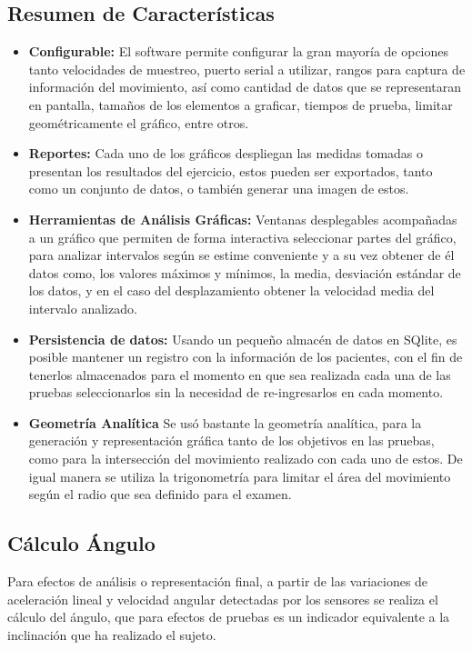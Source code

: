 \documentclass[12pt,a4paper]{article}
\begin{document}
\subsection{Resumen de Características}
\begin{itemize}
	\item \textbf{Configurable:} El software permite configurar la gran mayoría de opciones tanto velocidades de muestreo, puerto serial a utilizar, rangos para captura de información del movimiento, así como cantidad de datos que se representaran en pantalla, tamaños de los elementos a graficar, tiempos de prueba, limitar geométricamente el gráfico, entre otros.
	\item \textbf{Reportes:} Cada uno de los gráficos despliegan las medidas tomadas o presentan los resultados del ejercicio, estos pueden ser exportados, tanto como un conjunto de datos, o también generar una imagen de estos.
	\item \textbf{Herramientas de Análisis Gráficas:} Ventanas desplegables acompañadas a un gráfico que permiten de forma interactiva seleccionar partes del gráfico, para analizar intervalos según se estime conveniente y a su vez obtener de él datos como, los valores máximos y mínimos, la media, desviación estándar de los datos, y en el caso del desplazamiento obtener la velocidad media del intervalo analizado.
	\item \textbf{Persistencia de datos:} Usando un pequeño almacén de datos en SQlite, es posible mantener un registro con la información de los pacientes, con el fin de tenerlos almacenados para el momento en que sea realizada cada una de las pruebas seleccionarlos sin la necesidad de re-ingresarlos en cada momento.
	\item \textbf{Geometría Analítica} Se usó bastante la geometría analítica, para la generación y representación gráfica tanto de los objetivos en las pruebas, como para la intersección del movimiento realizado con cada uno de estos. De igual manera se utiliza la trigonometría para limitar el área del movimiento según el radio que sea definido para el examen.
\end{itemize}

\newpage
\subsection{Cálculo Ángulo} 
Para efectos de análisis o representación final, a partir de las variaciones de aceleración lineal y velocidad angular detectadas por los sensores se realiza el cálculo del ángulo, que para efectos de pruebas es un indicador equivalente a la inclinación que ha realizado el sujeto.
\end{document}
